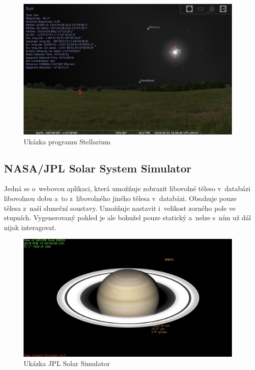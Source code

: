 \documentclass[a4paper,12pt]{article}
\begin{document}
\begin{figure}[H]
  \centering
  \includegraphics[width=450pt]{Images/Stellarium.png}
  \caption[Ukázka programu Stellarium]{Ukázka programu Stellarium  \footnotemark[1]}
\end{figure}

\subsection{NASA/JPL Solar System Simulator}

Jedná se o~webovou aplikaci, která umožňuje zobrazit libovolné těleso v~databázi libovolnou dobu a~to z~libovolného jiného tělesa v~databázi. Obsahuje pouze tělesa z~naší sluneční soustavy. Umožňuje nastavit i~velikost zorného pole ve stupních. Vygenerovaný pohled je ale bohužel pouze statický a~nelze s~ním už dál nijak interagovat.

\begin{figure}[H]
  \centering
  \includegraphics[width=450pt]{Images/JPLNasa.png}
  \caption[Ukázka JPL Solar System Simulator]{Ukázka JPL Solar Simulator   \footnotemark[2]}
\end{figure}
\end{document}
